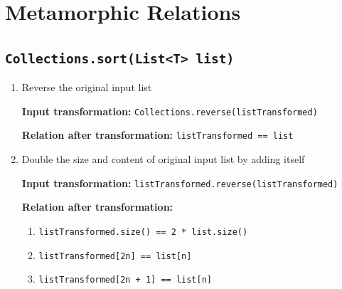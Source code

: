 \documentclass[12pt, a4paper]{article}
\begin{document}
\section{Metamorphic Relations}
\subsection{\texttt{Collections.sort(List<T> list)}}
\begin{enumerate}
  \item Reverse the original input list
  \par\quad\textbf{Input transformation:} \texttt{Collections.reverse(listTransformed)}
  \par\quad\textbf{Relation after transformation:} \texttt{listTransformed == list}

  \item Double the size and content of original input list by adding itself
  \par\quad\textbf{Input transformation:} \texttt{listTransformed.reverse(listTransformed)}
  \par\quad\textbf{Relation after transformation:}
  \begin{enumerate}
    \item \texttt{listTransformed.size() == 2 * list.size()}
    \item \texttt{listTransformed[2n] == list[n]}
    \item \texttt{listTransformed[2n + 1] == list[n]}
  \end{enumerate}
\end{enumerate}
\end{document}
